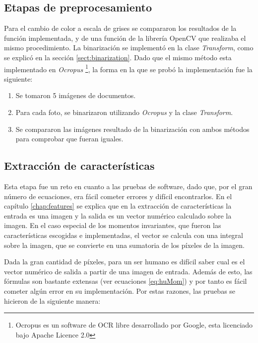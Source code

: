 \documentclass[a4paper, 11pt, oneside]{report}
\begin{document}
\subsection{Etapas de preprocesamiento}

Para el cambio de color a escala de grises se compararon los resultados de la función implementada, y de una función de la librería OpenCV que realizaba el mismo procedimiento. La binarización se implementó en la clase {\it Transform}, como se explicó en la sección \ref{sect:binarization}. Dado que el mismo método esta implementado en {\it Ocropus} \footnote{Ocropus es un software de OCR libre desarrollado por Google, esta licenciado bajo Apache Licence 2.0}, la forma en la que se probó la implementación fue la siguiente:

	\begin{enumerate}
	\item Se tomaron 5 imágenes de documentos.
	\item Para cada foto, se binarizaron utilizando {\it Ocropus} y la clase {\it Transform}.
	\item Se compararon las imágenes resultado de la binarización con ambos métodos para comprobar que fueran iguales.
	\end{enumerate}

\subsection{Extracción de características}

Esta etapa fue un reto en cuanto a las pruebas de software, dado que, por el gran número de ecuaciones, era fácil cometer errores y difícil encontrarlos. En el capítulo \ref{chap:features} se explica que en la extracción de características la entrada es una imagen y la salida es un vector numérico calculado sobre la imagen. En el caso especial de los momentos invariantes, que fueron las características escogidas e implementadas, el vector se calcula con una integral sobre la imagen, que se convierte en una sumatoria de los píxeles de la imagen.

Dada la gran cantidad de píxeles, para un ser humano es difícil saber cual es el vector numérico de salida a partir de una imagen de entrada. Además de esto, las fórmulas son bastante extensas (ver ecuaciones \ref{eq:huMom}) y por tanto es fácil cometer algún error en su implementación. Por estas razones, las pruebas se hicieron de la siguiente manera:
\end{document}
